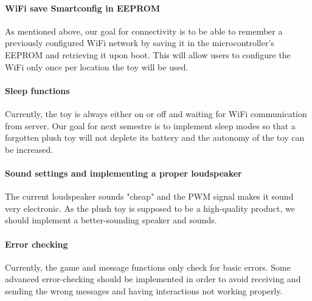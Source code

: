     \paragraph{WiFi save Smartconfig in EEPROM} As mentioned above, our goal for connectivity is to be able to remember a previously configured WiFi network by saving it in the microcontroller's EEPROM and retrieving it upon boot. This will allow users to configure the WiFi only once per location the toy will be used.
    \paragraph{Sleep functions} Currently, the toy is always either on or off and waiting for WiFi communication from server. Our goal for next semestre is to implement sleep modes so that a forgotten plush toy will not deplete its battery and the autonomy of the toy can be increased.
    \paragraph{Sound settings and implementing a proper loudspeaker} The current loudspeaker sounds "cheap" and the PWM signal makes it sound very electronic. As the plush toy is supposed to be a high-quality product, we should implement a better-sounding speaker and sounds. 
    \paragraph{Error checking} Currently, the game and message functions only check for basic errors. Some advanced error-checking should be implemented in order to avoid receiving and sending the wrong messages and having interactions not working properly.
    
    
    
